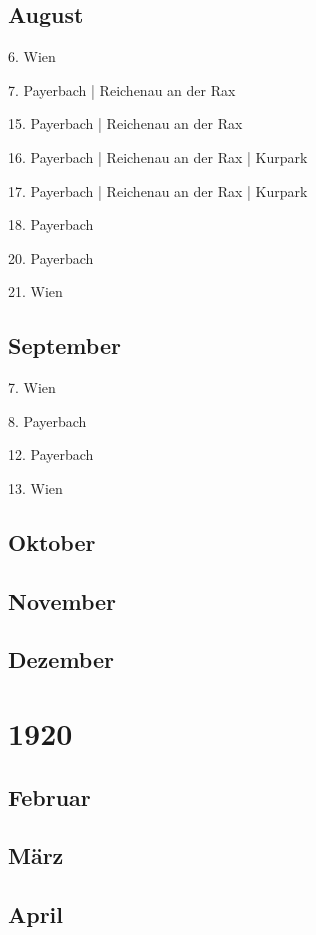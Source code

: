 \documentclass[twoside=false,titlepage=false,open=any, parskip=never, fontsize=10pt, headings=small, chapterprefix=false, appendixprefix=false, DIV=15]{scrbook}
\begin{document}
\begin{multicols}{3}
            \section*{August}
            6. Wien\par
            7. Payerbach | Reichenau an der Rax\par
            15. Payerbach | Reichenau an der Rax\par
            16. Payerbach | Reichenau an der Rax | Kurpark\par
            17. Payerbach | Reichenau an der Rax | Kurpark\par
            18. Payerbach\par
            20. Payerbach\par
            21. Wien\par
            \section*{September}
            7. Wien\par
            8. Payerbach\par
            12. Payerbach\par
            13. Wien\par
            \section*{Oktober}
            \section*{November}
            \section*{Dezember}
            \chapter*{1920}
            \section*{Februar}
            \section*{März}
            \section*{April}

\end{multicols}
\end{document}
